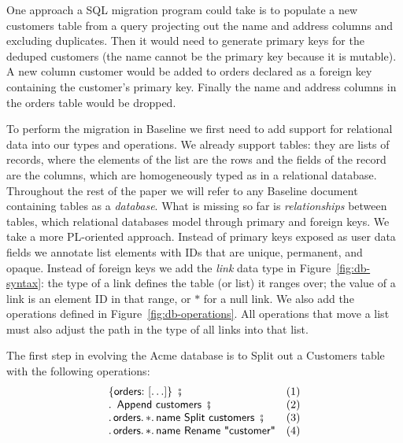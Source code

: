 \documentclass[english,submission]{programming}
\theoremstyle{definition}
\DeclareMathOperator{\exec}{\ \fatsemi\ \ }
\newcommand{\is}{{:}\ }
\newcommand{\quotedstring}[1]{\textsf{\textquotedbl{#1}\textquotedbl}}
\begin{document}
One approach a SQL migration program could take is to populate a new \textsf{customers} table from a query projecting out the \textsf{name} and \textsf{address} columns and excluding duplicates. Then it would need to generate primary keys for the deduped customers (the name cannot be the primary key because it is mutable). A new column \textsf{customer} would be added to \textsf{orders} declared as a foreign key containing the customer's primary key. Finally the \textsf{name} and \textsf{address} columns in the \textsf{orders} table would be dropped.

To perform the migration in Baseline we first need to add support for relational data into our types and operations.
We already support tables: they are lists of records, where the elements of the list are the rows and the fields of the record are the columns, which are homogeneously typed as in a relational database.
Throughout the rest of the paper we will refer to any Baseline document containing tables as a \textit{database}.
What is missing so far is \textit{relationships} between tables, which relational databases model through primary and foreign keys. We take a more PL-oriented approach.
Instead of primary keys exposed as user data fields we annotate list elements with IDs that are unique, permanent, and opaque. Instead of foreign keys we add the \textit{link} data type in Figure~\ref{fig:db-syntax}: the type of a link defines the table (or list) it ranges over; the value of a link is an element ID in that range, or $*$ for a null link. We also add the operations defined in Figure~\ref{fig:db-operations}. All operations that move a list must also adjust the path in the type of all links into that list.

The first step in evolving the Acme database is to \textsf{Split} out a \textsf{Customers} table with the following operations:
\[
\begin{array}{ll}
\{ \textsf{orders}\is [ \ldots ]\} \exec & \textrm{(1)}\\
\ldotp \textsf{ Append } \textsf{customers} \exec  & \textrm{(2)}\\
\ldotp \textsf{orders}\ldotp * \ldotp \textsf{name Split customers} \exec & \textrm{(3)}\\
\ldotp \textsf{orders}\ldotp * \ldotp \textsf{name Rename } \quotedstring{customer} & \textrm{(4)}\\
\end{array}\]

\end{document}
